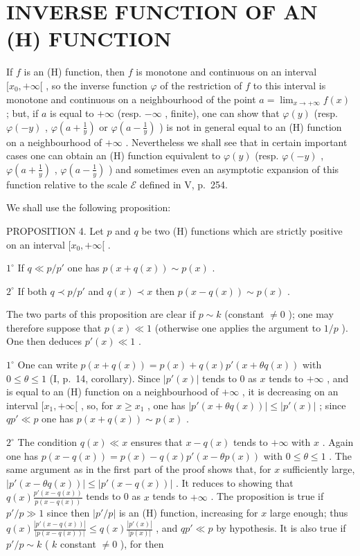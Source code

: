 \section{INVERSE FUNCTION OF AN (H) FUNCTION}

If \(f\) is an (H) function, then \(f\) is monotone and continuous on an interval \([x_0, +\infty[\) , so the inverse function \(\varphi\) of the restriction of \(f\) to this interval is monotone and continuous on a neighbourhood of the point \(a = \lim_{x \to +\infty} f(x)\) ; but, if \(a\) is equal to \(+\infty\) (resp. \(-\infty\) , finite), one can show that \(\varphi(y)\) (resp. \(\varphi(-y)\) , \(\varphi(a + \frac{1}{y})\) or \(\varphi(a - \frac{1}{y})\) ) is not in general equal to an (H) function on a neighbourhood of \(+\infty\) . Nevertheless we shall see that in certain important cases one can obtain an (H) function equivalent to \(\varphi(y)\) (resp. \(\varphi(-y)\) , \(\varphi(a + \frac{1}{y})\) , \(\varphi(a - \frac{1}{y})\) ) and sometimes even an asymptotic expansion of this function relative to the scale \(\mathcal{E}\) defined in V, p.~254.

We shall use the following proposition:

PROPOSITION 4. Let \(p\) and \(q\) be two (H) functions which are strictly positive on an interval \([x_0, +\infty[\) .

\(1^{\circ}\) If \(q \ll p / p'\) one has \(p(x + q(x)) \sim p(x)\) .

\(2^{\circ}\) If both \(q \prec p/p'\) and \(q(x) \prec x\) then \(p(x - q(x)) \sim p(x)\) .

The two parts of this proposition are clear if \(p \sim k\) (constant \(\neq 0\) ); one may therefore suppose that \(p(x) \ll 1\) (otherwise one applies the argument to \(1/p\) ). One then deduces \(p'(x) \ll 1\) .

\(1^{\circ}\) One can write \(p(x + q(x)) = p(x) + q(x)p'(x + \theta q(x))\) with \(0 \leqslant \theta \leqslant 1\) (I, p.~14, corollary). Since \(\left|p'(x)\right|\) tends to 0 as \(x\) tends to \(+\infty\) , and is equal to an (H) function on a neighbourhood of \(+\infty\) , it is decreasing on an interval \([x_1, +\infty[\) , so, for \(x \geqslant x_1\) , one has \(\left|p'(x + \theta q(x))\right| \leqslant \left|p'(x)\right|\) ; since \(qp' \ll p\) one has \(p(x + q(x)) \sim p(x)\) .

\(2^{\circ}\) The condition \(q(x) \ll x\) ensures that \(x - q(x)\) tends to \(+\infty\) with \(x\) . Again one has \(p(x - q(x)) = p(x) - q(x)p'(x - \theta p(x))\) with \(0 \leqslant \theta \leqslant 1\) . The same argument as in the first part of the proof shows that, for \(x\) sufficiently large, \(\left|p'(x - \theta q(x))\right| \leqslant \left|p'(x - q(x))\right|\) . It reduces to showing that \(q(x)\frac{p'(x - q(x))}{p(x - q(x))}\) tends to 0 as \(x\) tends to \(+\infty\) . The proposition is true if \(p'/p \gg 1\) since then \(\left|p'/p\right|\) is an (H) function, increasing for \(x\) large enough; thus \(q(x)\frac{\left|p'(x - q(x))\right|}{\left|p(x - q(x))\right|} \leqslant q(x)\frac{\left|p'(x)\right|}{\left|p(x)\right|}\) , and \(qp' \ll p\) by hypothesis. It is also true if \(p'/p \sim k\) ( \(k\) constant \(\neq 0\) ), for then

